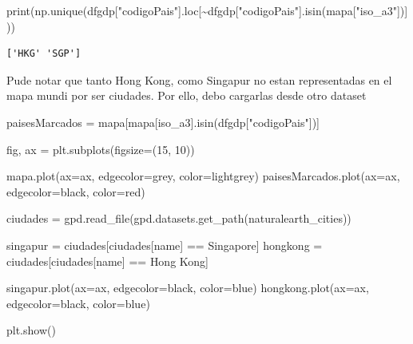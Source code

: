 \documentclass[
  letterpaper,
  DIV=11,
  numbers=noendperiod]{scrartcl}
\newenvironment{Shaded}{\begin{snugshade}}{\end{snugshade}}
\newcommand{\BuiltInTok}[1]{\textcolor[rgb]{0.00,0.23,0.31}{#1}}
\newcommand{\DecValTok}[1]{\textcolor[rgb]{0.68,0.00,0.00}{#1}}
\newcommand{\NormalTok}[1]{\textcolor[rgb]{0.00,0.23,0.31}{#1}}
\newcommand{\OperatorTok}[1]{\textcolor[rgb]{0.37,0.37,0.37}{#1}}
\newcommand{\StringTok}[1]{\textcolor[rgb]{0.13,0.47,0.30}{#1}}
\begin{document}
\begin{Shaded}
\begin{Highlighting}[]
\BuiltInTok{print}\NormalTok{(np.unique(dfgdp[}\StringTok{"codigoPais"}\NormalTok{].loc[}\OperatorTok{\textasciitilde{}}\NormalTok{dfgdp[}\StringTok{"codigoPais"}\NormalTok{].isin(mapa[}\StringTok{"iso\_a3"}\NormalTok{])]))}
\end{Highlighting}
\end{Shaded}

\begin{verbatim}
['HKG' 'SGP']
\end{verbatim}

Pude notar que tanto Hong Kong, como Singapur no estan representadas en
el mapa mundi por ser ciudades. Por ello, debo cargarlas desde otro
dataset

\begin{Shaded}
\begin{Highlighting}[]
\NormalTok{paisesMarcados }\OperatorTok{=}\NormalTok{ mapa[mapa[}\StringTok{\textquotesingle{}iso\_a3\textquotesingle{}}\NormalTok{].isin(dfgdp[}\StringTok{"codigoPais"}\NormalTok{])]}

\NormalTok{fig, ax }\OperatorTok{=}\NormalTok{ plt.subplots(figsize}\OperatorTok{=}\NormalTok{(}\DecValTok{15}\NormalTok{, }\DecValTok{10}\NormalTok{))}

\NormalTok{mapa.plot(ax}\OperatorTok{=}\NormalTok{ax, edgecolor}\OperatorTok{=}\StringTok{\textquotesingle{}grey\textquotesingle{}}\NormalTok{, color}\OperatorTok{=}\StringTok{\textquotesingle{}lightgrey\textquotesingle{}}\NormalTok{)}
\NormalTok{paisesMarcados.plot(ax}\OperatorTok{=}\NormalTok{ax, edgecolor}\OperatorTok{=}\StringTok{\textquotesingle{}black\textquotesingle{}}\NormalTok{, color}\OperatorTok{=}\StringTok{\textquotesingle{}red\textquotesingle{}}\NormalTok{)}

\NormalTok{ciudades }\OperatorTok{=}\NormalTok{ gpd.read\_file(gpd.datasets.get\_path(}\StringTok{\textquotesingle{}naturalearth\_cities\textquotesingle{}}\NormalTok{))}

\NormalTok{singapur }\OperatorTok{=}\NormalTok{ ciudades[ciudades[}\StringTok{\textquotesingle{}name\textquotesingle{}}\NormalTok{] }\OperatorTok{==} \StringTok{\textquotesingle{}Singapore\textquotesingle{}}\NormalTok{]}
\NormalTok{hongkong }\OperatorTok{=}\NormalTok{ ciudades[ciudades[}\StringTok{\textquotesingle{}name\textquotesingle{}}\NormalTok{] }\OperatorTok{==} \StringTok{\textquotesingle{}Hong Kong\textquotesingle{}}\NormalTok{]}

\NormalTok{singapur.plot(ax}\OperatorTok{=}\NormalTok{ax, edgecolor}\OperatorTok{=}\StringTok{\textquotesingle{}black\textquotesingle{}}\NormalTok{, color}\OperatorTok{=}\StringTok{\textquotesingle{}blue\textquotesingle{}}\NormalTok{)}
\NormalTok{hongkong.plot(ax}\OperatorTok{=}\NormalTok{ax, edgecolor}\OperatorTok{=}\StringTok{\textquotesingle{}black\textquotesingle{}}\NormalTok{, color}\OperatorTok{=}\StringTok{\textquotesingle{}blue\textquotesingle{}}\NormalTok{)}

\NormalTok{plt.show()}
\end{Highlighting}
\end{Shaded}
\end{document}
